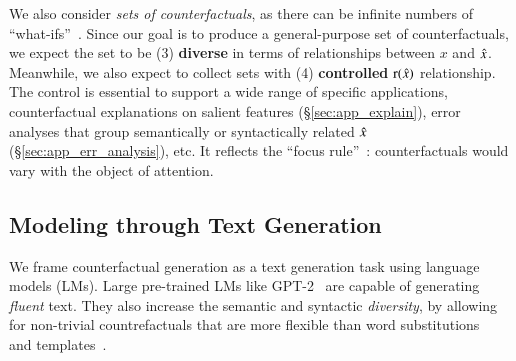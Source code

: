We also consider \emph{sets of counterfactuals}, as there can be infinite numbers of ``what-ifs''~\cite{pearl2018causal}. %
Since our goal is to produce a general-purpose set of counterfactuals, we expect the set to be (3) \textbf{diverse} in terms of relationships between $x$ and $\hat{x}$.
Meanwhile, we also expect to collect sets with (4) \textbf{controlled} $\operatorname*{r}(\hat{x})$ relationship.
The control is essential to support a wide range of specific applications, \eg counterfactual explanations on salient features (\S\ref{sec:app_explain}), error analyses that group semantically or syntactically related $\hat{x}$ (\S\ref{sec:app_err_analysis}), etc.
It reflects the ``focus rule''~\cite{kahneman}: counterfactuals would vary with the object of attention.





\subsection{Modeling through Text Generation}
\label{subsec:nlg}

We frame counterfactual generation as a text generation task using language models (LMs).
Large pre-trained LMs like GPT-2~\cite{radford2019language} are capable of generating \emph{fluent} text.
They also increase the semantic and syntactic \emph{diversity}, by allowing for non-trivial countrefactuals that are more flexible than word substitutions~\cite{garg2019counterfactual} and templates~\cite{ribeiro2018sear}. 




